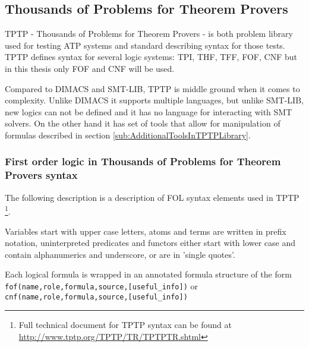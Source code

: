\subsection{Thousands of Problems for Theorem Provers}
\label{sec:TPTP}

TPTP \cite{Sut17} - Thousands of Problems for Theorem Provers - is both problem library used for testing \gls{ATP} systems and standard describing syntax for those tests. 
TPTP defines syntax for several logic systems: \gls{TPI}, \gls{THF}, \gls{TFF}, \gls{FOF}, \gls{CNF} but in this thesis only \gls{FOF} and \gls{CNF} will be used.

Compared to DIMACS and SMT-LIB, TPTP is middle ground when it comes to complexity. Unlike DIMACS it supports multiple languages, but unlike SMT-LIB, new logics can not be defined and it has no language for interacting with SMT solvers. On the other hand it has set of tools that allow for manipulation of formulas described in section \ref{sub:AdditionalToolsInTPTPLibrary}. 

\subsubsection{First order logic in Thousands of Problems for Theorem Provers syntax}

The following description is a description of \gls{FOL} syntax elements used in \gls{TPTP} \footnote{Full technical document for TPTP syntax can be found at \url{http://www.tptp.org/TPTP/TR/TPTPTR.shtml}}.

Variables start with upper case letters, atoms and terms are written in prefix notation, uninterpreted predicates and functors either start with lower case and contain alphanumerics and underscore, or are in 'single quotes'.

Each logical formula is wrapped in an annotated formula structure of the form \texttt{fof(name,role,formula,source,[useful_info])} or \texttt{cnf(name,role,formula,source,[useful_info])}

